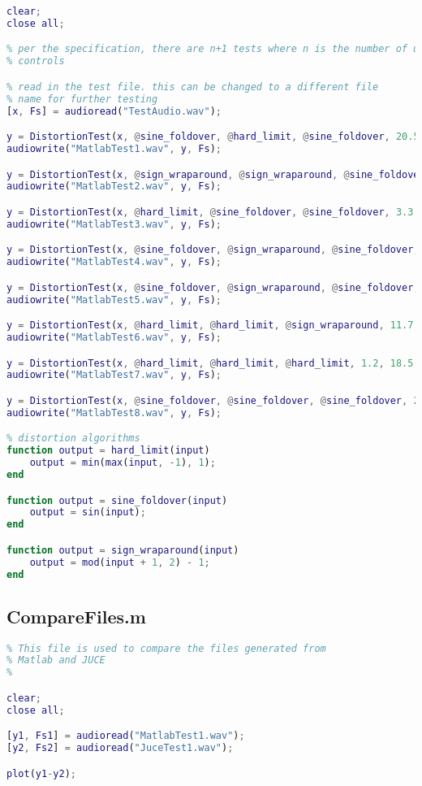 \documentclass{article}
\begin{document}
\begin{appendix}
\begin{lstlisting}[language=MATLAB]
clear;
close all;

% per the specification, there are n+1 tests where n is the number of user
% controls

% read in the test file. this can be changed to a different file
% name for further testing
[x, Fs] = audioread("TestAudio.wav");

y = DistortionTest(x, @sine_foldover, @hard_limit, @sine_foldover, 20.5, 18.1, 14.6, 0.8);
audiowrite("MatlabTest1.wav", y, Fs);

y = DistortionTest(x, @sign_wraparound, @sign_wraparound, @sine_foldover, 5.4, 23.7, 28.7, 0.52);
audiowrite("MatlabTest2.wav", y, Fs);

y = DistortionTest(x, @hard_limit, @sine_foldover, @sine_foldover, 3.3, 6.9, 7.5, 0.84);
audiowrite("MatlabTest3.wav", y, Fs);

y = DistortionTest(x, @sine_foldover, @sign_wraparound, @sine_foldover, 15, 7.8, 19.6, 0.57);
audiowrite("MatlabTest4.wav", y, Fs);

y = DistortionTest(x, @sine_foldover, @sign_wraparound, @sine_foldover, 22.5, 1.6, 25.4, 0.38);
audiowrite("MatlabTest5.wav", y, Fs);

y = DistortionTest(x, @hard_limit, @hard_limit, @sign_wraparound, 11.7, 14.1, 6.3, 0.55);
audiowrite("MatlabTest6.wav", y, Fs);

y = DistortionTest(x, @hard_limit, @hard_limit, @hard_limit, 1.2, 18.5, 16.1, 0.94);
audiowrite("MatlabTest7.wav", y, Fs);

y = DistortionTest(x, @sine_foldover, @sine_foldover, @sine_foldover, 2.2, 18.1, 11.4, 0.24);
audiowrite("MatlabTest8.wav", y, Fs);

% distortion algorithms
function output = hard_limit(input)
    output = min(max(input, -1), 1);
end

function output = sine_foldover(input)
    output = sin(input);
end

function output = sign_wraparound(input)
    output = mod(input + 1, 2) - 1;
end

\end{lstlisting}
\pagebreak
\subsection{CompareFiles.m}
\begin{lstlisting}[language=MATLAB]
%
% This file is used to compare the files generated from
% Matlab and JUCE
%

clear;
close all;

[y1, Fs1] = audioread("MatlabTest1.wav");
[y2, Fs2] = audioread("JuceTest1.wav");

plot(y1-y2);

\end{lstlisting}

\end{appendix}
\end{document}
